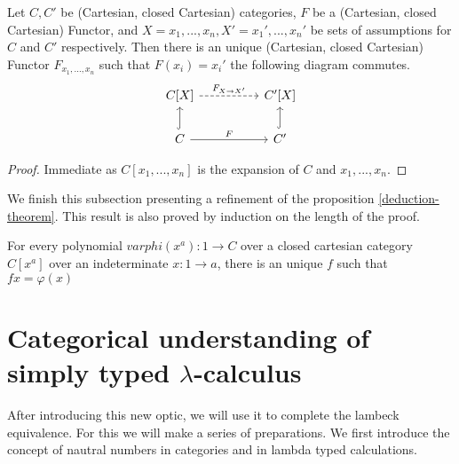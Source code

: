 \begin{proposition}\label{unique-polynomial-functor}Let $C,C'$ be (Cartesian, closed Cartesian) categories, $F$ be a (Cartesian, closed Cartesian) Functor, and $X={x_1,...,x_n}, X'={x_1',...,x_n'}$ be sets of assumptions for $C$ and $C'$ respectively. Then there is an unique (Cartesian, closed Cartesian) Functor $F_{x_1,...,x_n}$ such that $F(x_i)=x_i'$ the following diagram commutes. 
  \[
    \begin{tikzcd}
      C[X]\arrow[dashed]{rr}{F_{X\to X'}}&& C'[X]\\
      C \arrow{rr}{F}\arrow[hookrightarrow]{u}{}&& C'\arrow[hookrightarrow]{u}{}
    \end{tikzcd}
  \]
\end{proposition}
\begin{proof}
Immediate as $C[x_1,...,x_n]$ is the expansion of $C$ and ${x_1,...,x_n}$.  
\end{proof}


We finish this subsection presenting a refinement of the proposition \ref{deduction-theorem}. This result is also proved by induction on the length of the proof.

\begin{proposition}
For every polynomial $varphi(x^a): 1\to C$ over a closed cartesian category $C[x^a]$ over an indeterminate $x:1\to a$, there is an unique $f$ such that $fx=\varphi(x)$
\end{proposition}
\section{Categorical understanding of simply typed $\lambda$-calculus}
After introducing this new optic, we will use it to complete the lambeck equivalence. For this we will make a series of preparations. We first introduce the concept of nautral numbers in categories and in lambda typed calculations.\\


